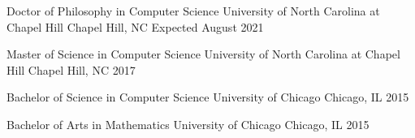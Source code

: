 
\begin{cventries}
  \cventry
    {Doctor of Philosophy in Computer Science} %
    {University of North Carolina at Chapel Hill} %
    {Chapel Hill, NC} %
    {Expected August 2021} %
    {}

  \cventry
    {Master of Science in Computer Science} %
    {University of North Carolina at Chapel Hill} %
    {Chapel Hill, NC} %
    {2017} %
    {}

  \cventry
    {Bachelor of Science in Computer Science} %
    {University of Chicago} %
    {Chicago, IL} %
    {2015} %
    {}

  \cventry
    {Bachelor of Arts in Mathematics} %
    {University of Chicago} %
    {Chicago, IL} %
    {2015} %
    {}

\end{cventries}
